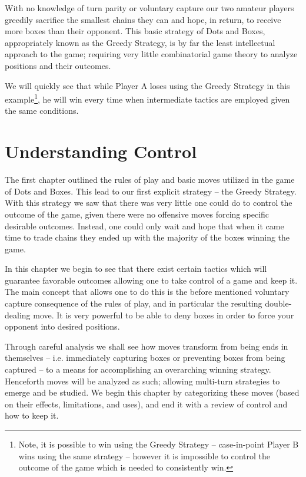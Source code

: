 \documentclass[12pt,twoside]{reedthesis}
\begin{document}
With no knowledge of turn parity or voluntary capture our two amateur players greedily sacrifice the smallest chains they can and hope, in return, to receive more boxes than their opponent.  This basic strategy of Dots and Boxes, appropriately known as the Greedy Strategy, is by far the least intellectual approach to the game; requiring very little combinatorial game theory to analyze positions and their outcomes.  

We will quickly see that while Player A loses using the Greedy Strategy in this example\footnote[3]{Note, it is possible to win using the Greedy Strategy -- case-in-point Player B wins using the same strategy -- however it is impossible to control the outcome of the game which is needed to consistently win.}, he will win every time when intermediate tactics are employed given the same conditions.



\chapter{Understanding Control}
The first chapter outlined the rules of play and basic moves utilized in the game of Dots and Boxes.  This lead to our first explicit strategy -- the Greedy Strategy.  With this strategy we saw that there was very little one could do to control the outcome of the game, given there were no offensive moves forcing specific desirable outcomes.  Instead, one could only wait and hope that when it came time to trade chains they ended up with the majority of the boxes winning the game.

In this chapter we begin to see that there exist certain tactics which will guarantee favorable outcomes allowing one to take control of a game and keep it.  The main concept that allows one to do this is the before mentioned voluntary capture consequence of the rules of play, and in particular the resulting double-dealing move.  It is very powerful to be able to deny boxes in order to force your opponent into desired positions.

Through careful analysis we shall see how moves transform from being ends in themselves -- i.e. immediately capturing boxes or preventing boxes from being captured -- to a means for accomplishing an overarching winning strategy.  Henceforth moves will be analyzed as such; allowing multi-turn strategies to emerge and be studied.  We begin this chapter by categorizing these moves (based on their effects, limitations, and uses),  and end it with a review of control and how to keep it.
\end{document}
